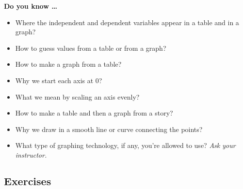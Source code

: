


\noindent \textbf{Do you know \ldots}

\begin{itemize}
\item Where the independent and dependent variables appear in a table and in a graph? 
\item How to guess values from a table or from a graph? 
\item How to make a graph from a table?
\item Why we start each axis at 0? 
\item What we mean by scaling an axis evenly? 
\item How to make a table and then a graph from a story? 
\item Why we draw in a smooth line or curve connecting the points? 
\item What type of graphing technology, if any, you're allowed to use?  \emph{Ask your instructor.}

\end{itemize}

\subsection*{Exercises} 

